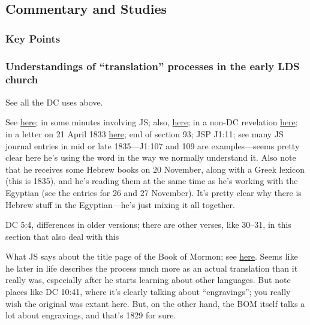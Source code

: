 	
\subsection{Commentary and Studies} %
	\label{TRANSLATION-COMMENTARY}

	\subsubsection{Key Points}
		\label{TRANSLATION-KEYS}
	
		\begin{compactitem}
			\item
		\end{compactitem}
		
	\subsubsection{Understandings of ``translation'' processes in the early LDS church}
		\label{TRANSLATION-meaning}
		
		See all the DC uses above.
			
		See \hyperref[EMS-1831-JS-25-26-OCT-1831]{here}; in some minutes involving JS; also, \hyperref[EMS-1831-JS-8-NOV-1831]{here}; in a non-DC revelation \hyperref[EMS-1832-JS-CIR-20-MAR-1832]{here}; in a letter on 21 April 1833 \hyperref[EMS-1833-JS-21-APR-1833]{here}; end of section 93; JSP J1:11; see many JS journal entries in mid or late 1835---J1:107 and 109 are examples---seems pretty clear here he's using the word in the way we normally understand it. Also note that he receives some Hebrew books on 20 November, along with a Greek lexicon (this is 1835), and he's reading them at the same time as he's working with the Egyptian (see the entries for 26 and 27 November). It's pretty clear why there is Hebrew stuff in the Egyptian---he's just mixing it all together.
		
		DC 5:4, differences in older versions; there are other verses, like 30--31, in this section that also deal with this
		
		What JS says about the title page of the Book of Mormon; see \hyperref[BOMTITLE]{here}. Seems like he later in life describes the process much more as an actual translation than it really was, especially after he starts learning about other languages.
			But note places like DC 10:41, where it's clearly talking about ``engravings''; you really wish the original was extant here. But, on the other hand, the BOM itself talks a lot about engravings, and that's 1829 for sure.
			
